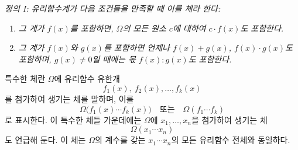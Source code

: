 
\emph{정의 I: 유리함수계가 다음 조건들을 만족할 때 이를 체라 한다:}
\begin{enumerate}
\item \emph{그 계가 $f(x)$를 포함하면, $\Omega$의 모든 원소 $c$에 대하여 $c\cdot f(x)$도 포함한다.}
\item \emph{그 계가 $f(x)$와 $g(x)$를 포함하면 언제나 $f(x)+g(x)$, $f(x)\cdot g(x)$도 포함하며, $g(x)\ne0$일 때에는 몫 $f(x):g(x)$도 포함한다.}
\end{enumerate}
특수한 체란 $\Omega$에 유리함수 유한개
\[
  f_1(x),\ f_2(x),\ldots, f_k(x)
\]
를 첨가하여 생기는 체를 말하며, 이를
\[
  \Omega\bigl(f_1(x)\cdots f_k(x)\bigr)
  \quad\text{또는}\quad
  \Omega(f_1\cdots f_k)
\]
로 표시한다. 이 특수한 체들 가운데에는 $\Omega$에 $x_1,\ldots,x_n$을 첨가하여 생기는 체
\[
  \Omega(x_1\cdots x_n)
\]
도 언급해 둔다. 이 체는 $\Omega$의 계수를 갖는 $x_1\cdots x_n$의 모든 유리함수 전체와 동일하다.
